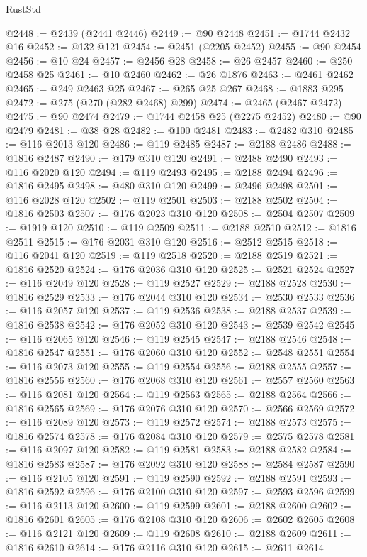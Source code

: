 \begin{lexlean}{RustStd}
\begin{coremodule}
@2448 := @2439 (@2441 @2446)
@2449 := @90 @2448
@2451 := @1744 @2432 @16
@2452 := @132 @121
@2454 := @2451 (@2205 @2452)
@2455 := @90 @2454
@2456 := @10 @24
@2457 := @2456 @28
@2458 := @26 @2457
@2460 := @250 @2458 @25
@2461 := @10 @2460
@2462 := @26 @1876
@2463 := @2461 @2462
@2465 := @249 @2463 @25
@2467 := @265 @25 @267
@2468 := @1883 @295
@2472 := @275 (@270 (@282 @2468) @299)
@2474 := @2465 (@2467 @2472)
@2475 := @90 @2474
@2479 := @1744 @2458 @25 (@2275 @2452)
@2480 := @90 @2479
@2481 := @38 @28
@2482 := @100 @2481
@2483 := @2482 @310
@2485 := @116 @2013 @120
@2486 := @119 @2485
@2487 := @2188 @2486
@2488 := @1816 @2487
@2490 := @179 @310 @120
@2491 := @2488 @2490
@2493 := @116 @2020 @120
@2494 := @119 @2493
@2495 := @2188 @2494
@2496 := @1816 @2495
@2498 := @480 @310 @120
@2499 := @2496 @2498
@2501 := @116 @2028 @120
@2502 := @119 @2501
@2503 := @2188 @2502
@2504 := @1816 @2503
@2507 := @176 @2023 @310 @120
@2508 := @2504 @2507
@2509 := @1919 @120
@2510 := @119 @2509
@2511 := @2188 @2510
@2512 := @1816 @2511
@2515 := @176 @2031 @310 @120
@2516 := @2512 @2515
@2518 := @116 @2041 @120
@2519 := @119 @2518
@2520 := @2188 @2519
@2521 := @1816 @2520
@2524 := @176 @2036 @310 @120
@2525 := @2521 @2524
@2527 := @116 @2049 @120
@2528 := @119 @2527
@2529 := @2188 @2528
@2530 := @1816 @2529
@2533 := @176 @2044 @310 @120
@2534 := @2530 @2533
@2536 := @116 @2057 @120
@2537 := @119 @2536
@2538 := @2188 @2537
@2539 := @1816 @2538
@2542 := @176 @2052 @310 @120
@2543 := @2539 @2542
@2545 := @116 @2065 @120
@2546 := @119 @2545
@2547 := @2188 @2546
@2548 := @1816 @2547
@2551 := @176 @2060 @310 @120
@2552 := @2548 @2551
@2554 := @116 @2073 @120
@2555 := @119 @2554
@2556 := @2188 @2555
@2557 := @1816 @2556
@2560 := @176 @2068 @310 @120
@2561 := @2557 @2560
@2563 := @116 @2081 @120
@2564 := @119 @2563
@2565 := @2188 @2564
@2566 := @1816 @2565
@2569 := @176 @2076 @310 @120
@2570 := @2566 @2569
@2572 := @116 @2089 @120
@2573 := @119 @2572
@2574 := @2188 @2573
@2575 := @1816 @2574
@2578 := @176 @2084 @310 @120
@2579 := @2575 @2578
@2581 := @116 @2097 @120
@2582 := @119 @2581
@2583 := @2188 @2582
@2584 := @1816 @2583
@2587 := @176 @2092 @310 @120
@2588 := @2584 @2587
@2590 := @116 @2105 @120
@2591 := @119 @2590
@2592 := @2188 @2591
@2593 := @1816 @2592
@2596 := @176 @2100 @310 @120
@2597 := @2593 @2596
@2599 := @116 @2113 @120
@2600 := @119 @2599
@2601 := @2188 @2600
@2602 := @1816 @2601
@2605 := @176 @2108 @310 @120
@2606 := @2602 @2605
@2608 := @116 @2121 @120
@2609 := @119 @2608
@2610 := @2188 @2609
@2611 := @1816 @2610
@2614 := @176 @2116 @310 @120
@2615 := @2611 @2614

\end{coremodule}
\end{lexlean}
